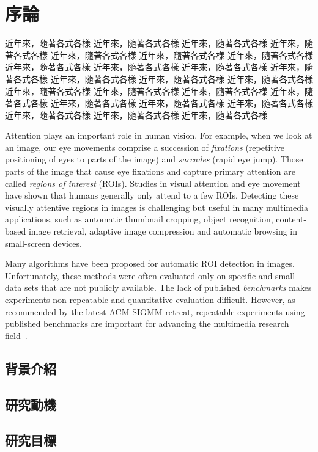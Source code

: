 \chapter{序論}
\label{c:intro}

近年來，隨著各式各樣
近年來，隨著各式各樣
近年來，隨著各式各樣
近年來，隨著各式各樣
近年來，隨著各式各樣
近年來，隨著各式各樣
近年來，隨著各式各樣
近年來，隨著各式各樣
近年來，隨著各式各樣
近年來，隨著各式各樣
近年來，隨著各式各樣
近年來，隨著各式各樣
近年來，隨著各式各樣
近年來，隨著各式各樣
近年來，隨著各式各樣
近年來，隨著各式各樣
近年來，隨著各式各樣
近年來，隨著各式各樣
近年來，隨著各式各樣
近年來，隨著各式各樣
近年來，隨著各式各樣
近年來，隨著各式各樣
近年來，隨著各式各樣
近年來，隨著各式各樣

Attention plays an important role in human vision. For example, when
we look at an image, our eye movements comprise a succession of {\em
fixations} (repetitive positioning of eyes to parts of the image)
and {\em saccades} (rapid eye jump). Those parts of the image that
cause eye fixations and capture primary attention are called {\em
regions of interest} (ROIs). Studies in visual attention and eye
movement have shown that humans generally only attend to a few ROIs.
Detecting these visually attentive regions in images is challenging
but useful in many multimedia applications, such as automatic
thumbnail cropping, object recognition, content-based image
retrieval, adaptive image compression and automatic browsing in
small-screen devices.

Many algorithms have been proposed for automatic ROI detection in
images. Unfortunately, these methods were often evaluated only on
specific and small data sets that are not publicly available. The
lack of published {\em benchmarks} makes experiments non-repeatable
and quantitative evaluation difficult. However, as recommended by
the latest ACM SIGMM retreat, repeatable experiments using published
benchmarks are important for advancing the multimedia research
field~\cite{Rowe:2005:ASR}.

\section{背景介紹}

\section{研究動機}

\section{研究目標}

